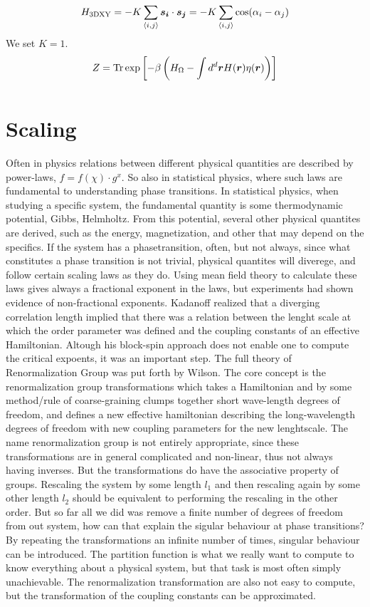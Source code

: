 \begin{equation}
  H_{\textrm{3DXY}} = -K\sum\limits_{\langle i,j\rangle} \bm{s_i}\cdot\bm{s_j} = -K\sum\limits_{\langle i,j\rangle} \cos(\alpha_i - \alpha_j)
\end{equation}
We set $K=1$.
\begin{equation}
  Z = \textrm{Tr} \exp\left[-\beta \left( H_\Omega - \int d^d \bm{r} H(\bm{r})\eta(\bm{r})\right)\right]
\end{equation}
\begin{equation}
  \label{}
\end{equation}
\section{Scaling}
Often in physics relations between different physical quantities are described by power-laws, $f = f(\chi)\cdot g^{x}$. So also in statistical physics, where such laws are fundamental to understanding phase transitions.
In statistical physics, when studying a specific system, the fundamental quantity is some thermodynamic potential,  Gibbs, Helmholtz. From this potential, several other physical quantites are derived, such as the energy, magnetization, and other that may depend on the specifics. 
If the system has a phasetransition, often, but not always, since what constitutes a phase transition is not trivial, physical quantites will diverege, and follow certain scaling laws as they do. 
Using mean field theory to calculate these laws gives always a fractional exponent in the laws, but experiments had shown evidence of non-fractional exponents. 
Kadanoff realized that a diverging correlation length implied that there was a relation between the lenght scale at which the order parameter was defined and the coupling constants of an effective Hamiltonian. Altough his block-spin approach does not enable one to compute the critical expoents, it was an important step.
The full theory of Renormalization Group was put forth by Wilson.
The core concept is the renormalization group transformations which takes a Hamiltonian and by some method/rule of coarse-graining clumps together short wave-length degrees of freedom, and defines a new effective hamiltonian describing the long-wavelength degrees of freedom with new coupling parameters for the new lenghtscale.
The name renormalization group is not entirely appropriate, since these transformations are in general complicated and non-linear, thus not always having inverses. But the transformations do have the associative property of groups. Rescaling the system by some length $l_1$ and then rescaling again by some other length $l_2$ should be equivalent to performing the rescaling in the other order.
But so far all we did was remove a finite number of degrees of freedom from out system, how can that explain the sigular behaviour at phase transitions? By repeating the transformations an infinite number of times, singular behaviour can be introduced.
The partition function is what we really want to compute to know everything about a physical system, but that task is most often simply unachievable. The renormalization transformation are also not easy to compute, but the transformation of the coupling constants can be approximated.
